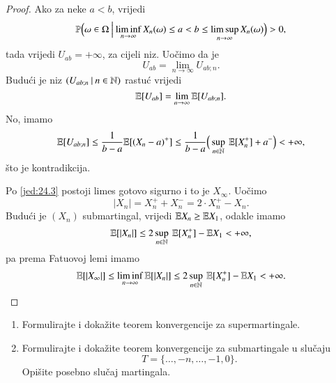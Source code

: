 \begin{proof}
    Ako za neke $a < b$, vrijedi
    \begin{equation*}
        \mathbb{P} \Big( {\omega \in \Omega} \: \Big| \: {\liminf\limits_{n \to \infty} X_n (\omega) \leq a < b \leq \limsup\limits_{n \to \infty} X_n (\omega) } \Big) > 0,
    \end{equation*}
    tada vrijedi $U_{a b} = +\infty$, za cijeli niz.
    Uo\v cimo da je
    \begin{equation*}
        U_{a b} = \lim\limits_{n \to \infty} U_{a b ; n}.
    \end{equation*}
    Budu\' ci je niz $({U_{a b; n}} \: | \: {n \in \mathbb{N}})$ rastu\' c vrijedi
    \begin{equation*}
        \mathbb{E} [U_{a b}] = \lim\limits_{n \to \infty} \mathbb{E} [U_{a b; n}].
    \end{equation*}
    No, imamo
    \begin{equation*}
        \mathbb{E} [U_{a b; n}] \leq \frac{1}{b - a} \mathbb{E} [(X_n - a)^+] \leq \frac{1}{b - a} \Big( \sup\limits_{n \in \mathbb{N}} \: \mathbb{E} [X_n^+] + a^- \Big) < +\infty,
    \end{equation*}
    \v sto je kontradikcija.

    Po \eqref{jed:24.3} postoji limes gotovo sigurno i to je $X_\infty$.
    Uo\v cimo
    \begin{equation*}
        |X_n| = X_n^+ + X_n^- = 2 \cdot X_n^+ - X_n .
    \end{equation*}
    Budu\' ci je $(X_n)$ submartingal, vrijedi $\mathbb{E} X_n \geq \mathbb{E} X_1$, odakle imamo
    \begin{equation*}
        \mathbb{E} [|X_n|] \leq 2 \sup\limits_{n \in \mathbb{N}} \: \mathbb{E} [X_n^+] - \mathbb{E} X_1 < +\infty,
    \end{equation*}
    pa prema Fatuovoj lemi imamo
    \begin{equation*}
        \mathbb{E} [|X_\infty|] \leq \liminf\limits_{n \to \infty} \mathbb{E} [|X_n|] \leq 2 \sup\limits_{n \in \mathbb{N}} \: \mathbb{E} [X_n^+] - \mathbb{E} X_1 < +\infty.
    \end{equation*}
\end{proof}

\begin{zad} \label{zad:24.5}
    \begin{enumerate}[label=(\alph*)]
        \item \label{zad:24.5.1}
        Formulirajte i doka\v zite teorem konvergencije za supermartingale.
        \item \label{zad:24.5.2}
        Formulirajte i doka\v zite teorem konvergencije za submartingale u slu\v caju
        \begin{equation*}
            T = \{ \ldots, -n, \ldots, -1, 0 \}.
        \end{equation*}
        Opi\v site posebno slu\v caj martingala.
    \end{enumerate}
\end{zad}

